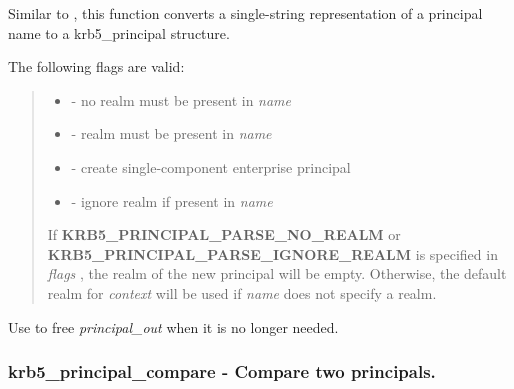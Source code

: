 \documentclass[letterpaper,10pt,english]{sphinxmanual}
\begin{document}
Similar to {\hyperref[appdev/refs/api/krb5_parse_name:krb5_parse_name]{}} , this function converts a single-string representation of a principal name to a krb5\_principal structure.

The following flags are valid:
\begin{quote}
\begin{itemize}
\item {} 
{\hyperref[appdev/refs/macros/KRB5_PRINCIPAL_PARSE_NO_REALM:KRB5_PRINCIPAL_PARSE_NO_REALM]{}} - no realm must be present in \emph{name}

\item {} 
{\hyperref[appdev/refs/macros/KRB5_PRINCIPAL_PARSE_REQUIRE_REALM:KRB5_PRINCIPAL_PARSE_REQUIRE_REALM]{}} - realm must be present in \emph{name}

\item {} 
{\hyperref[appdev/refs/macros/KRB5_PRINCIPAL_PARSE_ENTERPRISE:KRB5_PRINCIPAL_PARSE_ENTERPRISE]{}} - create single-component enterprise principal

\item {} 
{\hyperref[appdev/refs/macros/KRB5_PRINCIPAL_PARSE_IGNORE_REALM:KRB5_PRINCIPAL_PARSE_IGNORE_REALM]{}} - ignore realm if present in \emph{name}

\end{itemize}

If \textbf{KRB5\_PRINCIPAL\_PARSE\_NO\_REALM} or \textbf{KRB5\_PRINCIPAL\_PARSE\_IGNORE\_REALM} is specified in \emph{flags} , the realm of the new principal will be empty. Otherwise, the default realm for \emph{context} will be used if \emph{name} does not specify a realm.
\end{quote}

Use {\hyperref[appdev/refs/api/krb5_free_principal:krb5_free_principal]{}} to free \emph{principal\_out} when it is no longer needed.


\subsubsection{krb5\_principal\_compare -  Compare two principals.}
\label{appdev/refs/api/krb5_principal_compare:krb5-principal-compare-compare-two-principals}\label{appdev/refs/api/krb5_principal_compare::doc}
\end{document}
